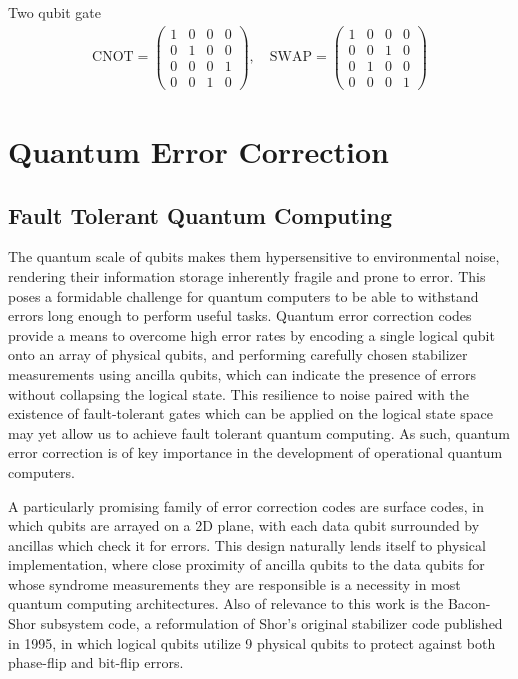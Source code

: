 \documentclass[../Thesis.tex]{subfiles}
\begin{document}
Two qubit gate
\begin{align}
    \text{CNOT} = \begin{pmatrix} 1 &0 &0 &0\\ 0 &1 &0 &0\\
                            0 &0 &0 &1\\ 0 &0 &1 &0\end{pmatrix},\quad 
    \text{SWAP} = 
        \begin{pmatrix}
            1 &0 &0 &0\\
            0 &0 &1 &0\\
            0 &1 &0 &0\\
            0 &0 &0 &1
        \end{pmatrix}
\end{align}     


\section{Quantum Error Correction}
\subsection{Fault Tolerant Quantum Computing}

The quantum scale of qubits makes them hypersensitive to environmental noise, rendering their information storage inherently fragile and prone to error. This poses a formidable challenge for quantum computers to be able to withstand errors long enough to perform useful tasks. Quantum error correction codes provide a means to overcome high error rates by encoding a single logical qubit onto an array of physical qubits, and performing carefully chosen stabilizer measurements using ancilla qubits, which can indicate the presence of errors without collapsing the logical state. This resilience to noise paired with the existence of fault-tolerant gates which can be applied on the logical state space may yet allow us to achieve fault tolerant quantum computing\cite{nielsen_quantum_2010}. As such, quantum error correction is of key importance in the development of operational quantum computers.

A particularly promising family of error correction codes are surface codes,\cite{fowler_surface_2012} in which qubits are arrayed on a 2D plane, with each data qubit surrounded by ancillas which check it for errors. This design naturally lends itself to physical implementation, where close proximity of ancilla qubits to the data qubits for whose syndrome measurements they are responsible is a necessity in most quantum computing architectures. Also of relevance to this work is the Bacon-Shor subsystem code\cite{bacon_quantum_2006}, a reformulation of Shor's original stabilizer code published in 1995\cite{shor_scheme_1995}, in which logical qubits utilize 9 physical qubits to protect against both phase-flip and bit-flip errors.
\end{document}
